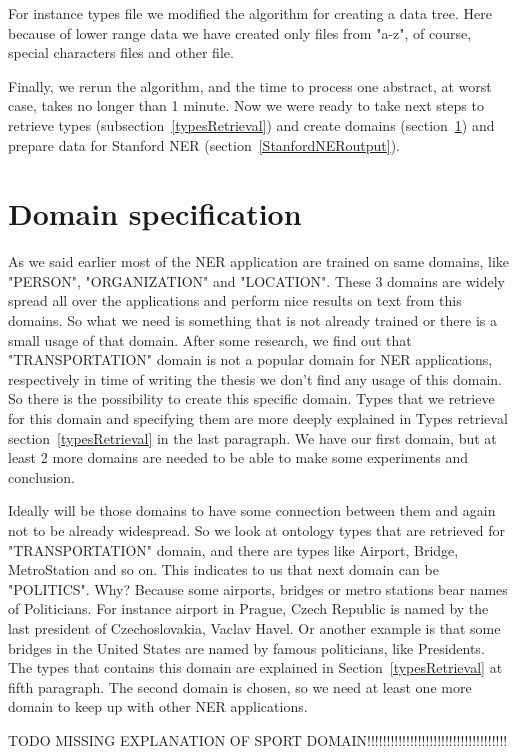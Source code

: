 \documentclass[thesis=M,english]{FITthesis}[2018/05/30]
\begin{document}
	For instance types file we modified the algorithm for creating a data tree. Here because of lower range data we have created only files from "a-z", of course, special characters files and other file.

	Finally, we rerun the algorithm, and the time to process one abstract, at worst case, takes no longer than 1 minute. Now we were ready to take next steps to retrieve types (subsection~\ref{typesRetrieval}) and create domains (section~\ref{domainSpecification}) and prepare data for Stanford NER (section~\ref{StanfordNERoutput}).

\section{Domain specification}\label{domainSpecification}
	As we said earlier most of the NER application are trained on same domains, like "PERSON", "ORGANIZATION" and "LOCATION". These 3 domains are widely spread all over the applications and perform nice results on text from this domains. So what we need is something that is not already trained or there is a small usage of that domain. After some research, we find out that "TRANSPORTATION" domain is not a popular domain for NER applications, respectively in time of writing the thesis we don't find any usage of this domain. So there is the possibility to create this specific domain. Types that we retrieve for this domain and specifying them are more deeply explained in Types retrieval section~\ref{typesRetrieval} in the last paragraph. We have our first domain, but at least 2 more domains are needed to be able to make some experiments and conclusion. 

	Ideally will be those domains to have some connection between them and again not to be already widespread. So we look at ontology types that are retrieved for "TRANSPORTATION" domain, and there are types like Airport, Bridge, MetroStation and so on. This indicates to us that next domain can be "POLITICS". Why? Because some airports, bridges or metro stations bear names of Politicians. For instance airport in Prague, Czech Republic is named by the last president of Czechoslovakia, Vaclav Havel. Or another example is that some bridges in the United States are named by famous politicians, like Presidents. The types that contains this domain are explained in Section~\ref{typesRetrieval} at fifth paragraph. The second domain is chosen, so we need at least one more domain to keep up with other NER applications. 
	
TODO MISSING EXPLANATION OF SPORT DOMAIN!!!!!!!!!!!!!!!!!!!!!!!!!!!!!!!!!!!!
\end{document}
